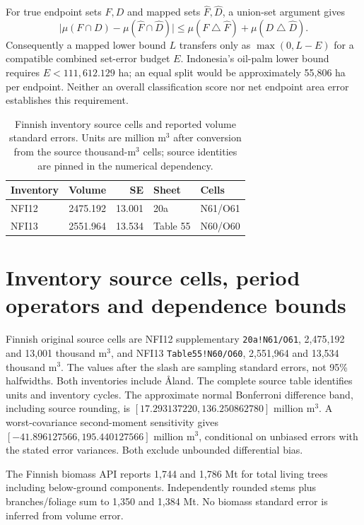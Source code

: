 For true endpoint sets $F,D$ and mapped sets $\widehat F,\widehat D$, a union-set argument gives
\[
\bigl|\mu(F\cap D)-\mu(\widehat F\cap\widehat D)\bigr|
\le\mu(F\mathbin{\triangle}\widehat F)+\mu(D\mathbin{\triangle}\widehat D).
\]
Consequently a mapped lower bound $L$ transfers only as $\max(0,L-E)$ for a compatible combined set-error budget $E$. Indonesia's oil-palm lower bound requires $E<111,612.129$ ha; an equal split would be approximately 55,806 ha per endpoint. Neither an overall classification score nor net endpoint area error establishes this requirement.

\begin{table}[htbp]
\centering\small
\caption{Finnish inventory source cells and reported volume standard errors. Units are million m$^3$ after conversion from the source thousand-m$^3$ cells; source identities are pinned in the numerical dependency.}\label{tab:SI_inventory_cells}
\begin{tabularx}{\textwidth}{lrrll}\toprule
Inventory & Volume & SE & Sheet & Cells\\\midrule
NFI12 & 2475.192 & 13.001 & 20a & N61/O61\\
NFI13 & 2551.964 & 13.534 & Table 55 & N60/O60\\
\bottomrule\end{tabularx}
\end{table}

\section{Inventory source cells, period operators and dependence bounds}
Finnish original source cells are NFI12 supplementary \texttt{20a!N61/O61}, 2,475,192 and 13,001 thousand m$^3$, and NFI13 \texttt{Table55!N60/O60}, 2,551,964 and 13,534 thousand m$^3$. The values after the slash are sampling standard errors, not 95\% halfwidths. Both inventories include \AA land. The complete source table identifies units and inventory cycles. The approximate normal Bonferroni difference band, including source rounding, is $[17.293137220,136.250862780]$ million m$^3$. A worst-covariance second-moment sensitivity gives $[-41.896127566,195.440127566]$ million m$^3$, conditional on unbiased errors with the stated error variances. Both exclude unbounded differential bias.

The Finnish biomass API reports 1,744 and 1,786 Mt for total living trees including below-ground components. Independently rounded stems plus branches/foliage sum to 1,350 and 1,384 Mt. No biomass standard error is inferred from volume error. 

